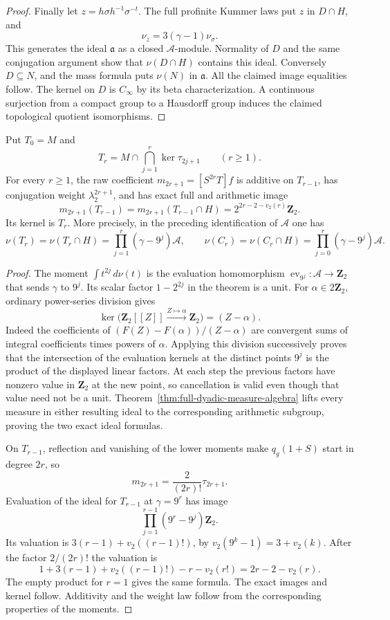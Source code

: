 \begin{proof}
Finally let $z=h\sigma h^{-1}\sigma^{-t}$. The full profinite
Kummer laws put $z$ in $D\cap H$, and
\[
 \nu_z=3(\gamma-1)\nu_\sigma.
\]
This generates the ideal $\mathfrak a$ as a closed
$\mathcal A$-module. Normality of $D$ and the same conjugation
argument show that $\nu(D\cap H)$ contains this ideal.
Conversely $D\subseteq N$, and the mass formula puts $\nu(N)$
in $\mathfrak a$. All the claimed image equalities follow.
The kernel on $D$ is $C_\infty$ by its beta characterization.
A continuous surjection from a compact group to a Hausdorff group
induces the claimed topological quotient isomorphisms.
\end{proof}

\begin{corollary}\label{cor:unnormalized-odd-images}
Put $T_0=M$ and
\[
 T_r=M\cap\bigcap_{j=1}^r\ker\tau_{2j+1}\qquad(r\ge1).
\]
For every $r\ge1$, the raw coefficient
$m_{2r+1}=[S^{2r}T]f$ is additive on $T_{r-1}$, has conjugation
weight $\lambda_2^{2r+1}$, and has exact full and arithmetic image
\[
 m_{2r+1}(T_{r-1})=m_{2r+1}(T_{r-1}\cap H)
                  =2^{2r-2-v_2(r)}\mathbf Z_2.
\]
Its kernel is $T_r$. More precisely, in the preceding identification
of $\mathcal A$ one has
\[
 \nu(T_r)=\nu(T_r\cap H)
       =\prod_{j=1}^r(\gamma-9^j)\mathcal A,
 \qquad
 \nu(C_r)=\nu(C_r\cap H)
       =\prod_{j=0}^r(\gamma-9^j)\mathcal A.
\]
\end{corollary}

\begin{proof}
The moment $\int t^{2j}\,d\nu(t)$ is the evaluation homomorphism
$\operatorname{ev}_{9^j}:\mathcal A\to\mathbf Z_2$ that sends
$\gamma$ to $9^j$. Its scalar factor $1-2^{2j}$ in the theorem
is a unit. For $\alpha\in2\mathbf Z_2$, ordinary power-series
division gives
\[
 \ker\bigl(\mathbf Z_2[[Z]]\xrightarrow{Z\mapsto\alpha}
                  \mathbf Z_2\bigr)=(Z-\alpha).
\]
Indeed the coefficients of $(F(Z)-F(\alpha))/(Z-\alpha)$ are
convergent sums of integral coefficients times powers of $\alpha$.
Applying this division successively proves that the intersection
of the evaluation kernels at the distinct points $9^j$ is the
product of the displayed linear factors. At each step the
previous factors have nonzero value in $\mathbf Z_2$ at the new
point, so cancellation is valid even though that value need not
be a unit. Theorem~\ref{thm:full-dyadic-measure-algebra} lifts
every measure in either resulting ideal to the corresponding
arithmetic subgroup, proving the two exact ideal formulas.

On $T_{r-1}$, reflection and vanishing of the lower moments make
$q_g(1+S)$ start in degree $2r$, so
\[
 m_{2r+1}=\frac{2}{(2r)!}\tau_{2r+1}.
\]
Evaluation of the ideal for $T_{r-1}$ at $\gamma=9^r$ has image
\[
 \prod_{j=1}^{r-1}(9^r-9^j)\mathbf Z_2.
\]
Its valuation is $3(r-1)+v_2((r-1)!)$, by
$v_2(9^k-1)=3+v_2(k)$. After the factor $2/(2r)!$ the valuation is
\[
 1+3(r-1)+v_2((r-1)!)-r-v_2(r!)=2r-2-v_2(r).
\]
The empty product for $r=1$ gives the same formula. The exact
images and kernel follow. Additivity and the weight law follow
from the corresponding properties of the moments.
\end{proof}

